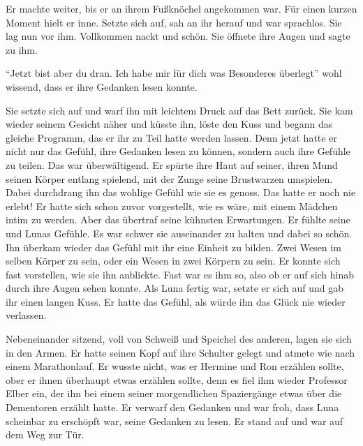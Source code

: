 \begin{abAchtzehn}

Er machte weiter, bis er an ihrem Fußknöchel angekommen war. Für einen kurzen Moment hielt er inne. Setzte sich auf, sah an ihr herauf und war sprachlos. Sie lag nun vor ihm. Vollkommen nackt und schön. Sie öffnete ihre Augen und sagte zu ihm.

\enquote{Jetzt bist aber du dran. Ich habe mir für dich was Besonderes überlegt} wohl wissend, dass er ihre Gedanken lesen konnte.

Sie setzte sich auf und warf ihn mit leichtem Druck auf das Bett zurück. Sie kam wieder seinem Gesicht näher und küsste ihn, löste den Kuss und begann das gleiche Programm, das er ihr zu Teil hatte werden lassen. Denn jetzt hatte er nicht nur das Gefühl, ihre Gedanken lesen zu können, sondern auch ihre Gefühle zu teilen. Das war überwältigend. Er spürte ihre Haut auf seiner, ihren Mund seinen Körper entlang spielend, mit der Zunge seine Brustwarzen umspielen. Dabei durchdrang ihn das wohlige Gefühl wie sie es genoss. Das hatte er noch nie erlebt! Er hatte sich schon zuvor vorgestellt, wie es wäre, mit einem Mädchen intim zu werden. Aber das übertraf seine kühnsten Erwartungen. Er fühlte seine und Lunas Gefühle. Es war schwer sie auseinander zu halten und dabei so schön. Ihn überkam wieder das Gefühl mit ihr eine Einheit zu bilden. Zwei Wesen im selben Körper zu sein, oder ein Wesen in zwei Körpern zu sein. Er konnte sich fast vorstellen, wie sie ihn anblickte. Fast war es ihm so, also ob er auf sich hinab durch ihre Augen sehen konnte. Als Luna fertig war, setzte er sich auf und gab ihr einen langen Kuss. Er hatte das Gefühl, als würde ihn das Glück nie wieder verlassen.

\end{abAchtzehn}

\begin{safedivide}
\fskdivider
\end{safedivide}

Nebeneinander sitzend, voll von Schweiß und Speichel des anderen, lagen sie sich in den Armen. Er hatte seinen Kopf auf ihre Schulter gelegt und atmete wie nach einem Marathonlauf. Er wusste nicht, was er Hermine und Ron erzählen sollte, ober er ihnen überhaupt etwas erzählen sollte, denn es fiel ihm wieder Professor Elber ein, der ihn bei einem seiner morgendlichen Spaziergänge etwas über die Dementoren erzählt hatte. Er verwarf den Gedanken und war froh, dass Luna scheinbar zu erschöpft war, seine Gedanken zu lesen. Er stand auf und war auf dem Weg zur Tür.

